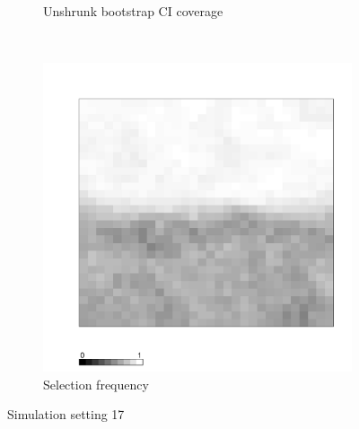 \documentclass[authoryear, review, 11pt]{elsarticle}
\begin{document}
\begin{figure}
\begin{subfigure}[b]{0.45\textwidth}
		\caption{Unshrunk bootstrap CI coverage}
	\end{subfigure}%
	~ %
	\begin{subfigure}[b]{0.45\textwidth}
	\centering
		\includegraphics[width=\textwidth]{../../figures/simulation/X1.15.17.selection.pdf}
		\caption{Selection frequency}
	\end{subfigure}
	\caption{Simulation setting 17}
\end{figure}
\end{document}
